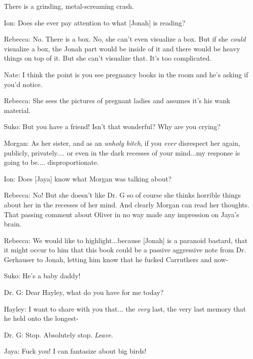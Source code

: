 There is a grinding, metal-screaming crash.







Ion: Does she ever pay attention to what {[}Jonah{]} is reading?

Rebecca: No.  There is a box.  No, she can't even visualize a box.  But if she \textit{could} visualize a box, the Jonah part would be inside of it and there would be heavy things on top of it.  But she can't visualize that.  It's too complicated.

Nate: I think the point is you see pregnancy books in the room and he's asking if you'd notice.

Rebecca: She sees the pictures of pregnant ladies and assumes it's his wank material.



Suko: But you have a friend!  Isn't that wonderful?  Why are you crying?



Morgan: As her sister, and as an \textit{unholy bitch}, if you \textit{ever} disrespect her again, publicly, privately.... or even in the dark recesses of your mind...my response is going to be.... disproportionate.



Ion: Does {[}Jaya{]} know what Morgan was talking about?

Rebecca: No!  But she doesn't like Dr. G so of course she thinks horrible things about her in the recesses of her mind.  And clearly Morgan can read her thoughts.  That passing comment about Oliver in no way made any impression on Jaya's brain.



Rebecca: We would like to highlight...because {[}Jonah{]} is a paranoid bastard, that it might occur to him that this book could be a passive aggressive note from Dr. Gerhauser to Jonah, letting him know that he fucked Carruthers and now-

Suko: He's a baby daddy!



Dr. G: Dear Hayley, what do you have for me today?

Hayley: I want to share with you that... the \textit{very} last, the very last memory that he held onto the longest-

Dr. G: Stop.  Absolutely stop.  \textit{Leave}.



Jaya: Fuck you!  I can fantasize about big birds!




